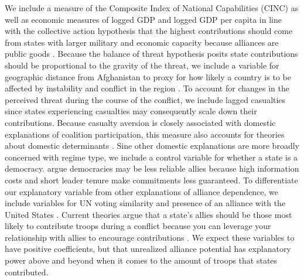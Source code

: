 \documentclass[12pt,letterpaper]{article}
\begin{document}
		We include a measure of the Composite Index of National Capabilities (CINC) as well as economic measures of logged GDP and logged GDP per capita in line with the collective action hypothesis that the highest contributions should come from states with larger military and economic capacity because alliances are public goods \citep{olson_economictheoryalliances_1966, singer_capabilitydistributionuncertainty_1972}. Because the balance of threat hypothesis posits state contributions should be proportional to the gravity of the threat, we include a variable for geographic distance from Afghanistan to proxy for how likely a country is to be affected by instability and conflict in the region \citep{weidmann_geographyinternationalsystem_2010}. To account for changes in the perceived threat during the course of the conflict, we include lagged casualties since states experiencing casualties may consequently scale down their contributions. Because casualty aversion is closely associated with domestic explanations of coalition participation, this measure also accounts for theories about domestic determinants \citep{koch_casualtiesconstituenciesdemocratic_2005, jakobsen_denmarkafghanistanworth_2015}. Sine other domestic explanations are more broadly concerned with regime type, we include a control variable for whether a state is a democracy. \citet{gartzke_democracypreparationwar_2001, gartzke_whydemocraciesmay_2004} argue democracies may be less reliable allies because high information costs and short leader tenure make commitments less guaranteed. To differentiate our explanatory variable from other explanations of alliance dependence, we include variables for UN voting similarity and presence of an alliance with the United States \citep{bailey_estimatingdynamicstate_2017}. Current theories argue that a state's allies should be those most likely to contribute troops during a conflict because you can leverage your relationship with allies to encourage contributions \citep{davidson_neoclassicalrealistexplanation_2011}. We expect these variables to have positive coefficients, but that unrealized alliance potential has explanatory power above and beyond when it comes to the amount of troops that states contributed.
		
		\newpage
		
		\newpage
\end{document}
